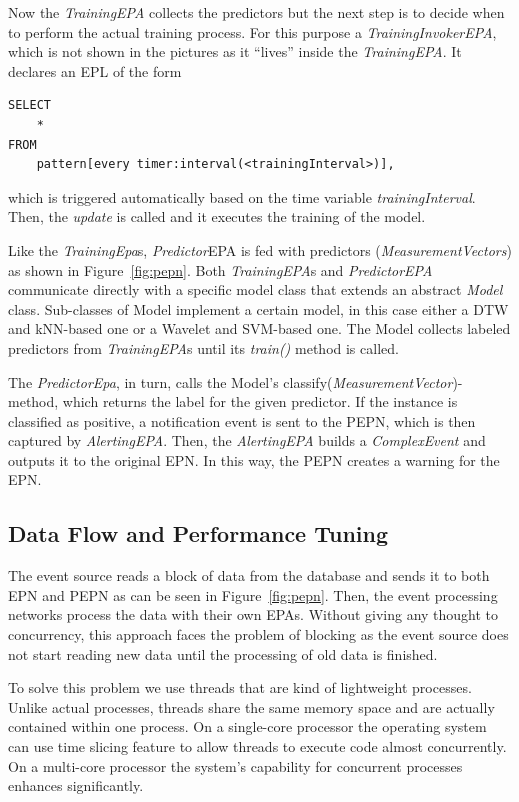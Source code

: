 Now the \emph{TrainingEPA} collects the predictors but the next step is to decide when to perform the actual training process. For this purpose a \emph{TrainingInvokerEPA}, which is not shown in the pictures as it ``lives'' inside the \emph{TrainingEPA}. It declares an EPL of the form

\begin{Verbatim}[xleftmargin=1.5em]
SELECT 
	* 
FROM 
	pattern[every timer:interval(<trainingInterval>)],
\end{Verbatim} 
which is triggered automatically based on the time variable \emph{trainingInterval}. Then, the \emph{update} is called and it executes the training of the model.

Like the \emph{TrainingEpa}s, \emph{Predictor}EPA is fed with predictors (\emph{MeasurementVectors}) as shown in Figure~\ref{fig:pepn}. Both \emph{TrainingEPA}s and \emph{PredictorEPA} communicate directly with a specific model class that extends an abstract \emph{Model} class. Sub-classes of Model implement a certain model, in this case either a DTW and kNN-based one or a Wavelet and SVM-based one. The Model collects labeled predictors from \emph{TrainingEPA}s until its \emph{train()} method is called.

The \emph{PredictorEpa}, in turn, calls the Model's classify(\emph{MeasurementVector})-method, which returns the label for the given predictor. If the instance is classified as positive, a notification event is sent to the PEPN, which is then captured by \emph{AlertingEPA}. Then, the \emph{AlertingEPA} builds a \emph{ComplexEvent} and outputs it to the original EPN. In this way, the PEPN creates a warning for the EPN.


\subsection{Data Flow and Performance Tuning}
The event source reads a block of data from the database and sends it to both EPN and PEPN as can be seen in Figure~\ref{fig:pepn}. Then, the event processing networks process the data with their own EPAs. Without giving any thought to concurrency, this approach faces the problem of blocking as the event source does not start reading new data until the processing of old data is finished. 

To solve this problem we use threads that are kind of lightweight processes. \cite{Java} Unlike actual processes, threads share the same memory space and are actually contained within one process. On a single-core processor the operating system can use time slicing feature to allow threads to execute code almost concurrently. On a multi-core processor the system's capability for concurrent processes enhances significantly.


